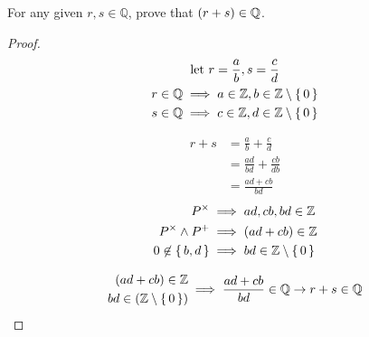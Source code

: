 \question For any given $r, s \in \mathbb{Q}$, prove that ${ \left(r+s\right) } \in \mathbb Q$.

\begin{proof}
	\begin{gather*}
		{\text{let } } r = \frac{a}{b}, s = \frac{c}{d} \\
		r \in {\mathbb Q} \implies a \in {\mathbb Z}, b \in {\mathbb Z}\setminus\set{0}\\
		s \in {\mathbb Q} \implies c \in {\mathbb Z}, d \in {\mathbb Z}\setminus\set{0}
	\end{gather*}

	\begin{align*}
		r+s & =  \frac{a}{b} + \frac{c}{d}        \\
		    & = \frac{a d}{b d} + \frac{c b}{d b} \\
		    & = \frac{a d + c b}{b d}
	\end{align*}
	\begin{align*}
		P^{\times}            & \implies  {a d, c b, b d} \in {\mathbb Z}     \\
		P^{\times} \wedge P^+ & \implies { \left( a d + c b \right) } \in {\mathbb Z}     \\
		0 \not\in \set{b, d}  & \implies		b d \in {\mathbb Z}\setminus\set{0}
	\end{align*}

	\begin{equation*}
		\begin{split}
			{ \left(a d  +    c b\right) } \in {\mathbb Z}           & \\
			b d  \in { \left({\mathbb Z}\setminus \set{0} \right) } &
		\end{split}
		\implies  \frac{a d + c b}{b d} \in {\mathbb Q}  \rightarrow	 r+s \in {\mathbb Q}
	\end{equation*}

\end{proof}
